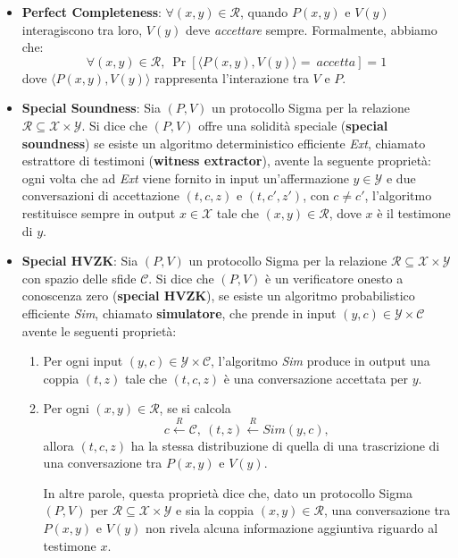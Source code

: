 \begin{itemize}
	\item \textbf{Perfect Completeness}: $\forall (x, y) \in \mathcal{R}$, quando $P(x, y)$ e $V(y)$ interagiscono tra loro, $V(y)$ deve \textit{accettare} sempre. Formalmente, abbiamo che:
	      $$\forall (x, y) \in \mathcal{R},\ \Pr \left[\langle P(x, y), V(y) \rangle =\ accetta \right] = 1$$
	      dove $\langle P(x, y), V(y) \rangle$ rappresenta l'interazione tra $V$ e $P$.
	\item \textbf{Special Soundness}: Sia $(P, V)$ un protocollo Sigma per la relazione $\mathcal{R} \subseteq \mathcal{X} \times \mathcal{Y}$. Si dice che $(P, V)$ offre una solidità speciale (\textbf{special soundness}) se esiste un algoritmo deterministico efficiente \textit{Ext}, chiamato estrattore di testimoni (\textbf{witness extractor}), avente la seguente proprietà: ogni volta che ad \textit{Ext} viene fornito in input un'affermazione $y \in \mathcal{Y}$ e due conversazioni di accettazione $(t, c, z)$ e $(t, c', z')$, con $c \neq c'$, l'algoritmo restituisce sempre in output $x \in \mathcal{X}$ tale che $(x, y) \in \mathcal{R}$, dove $x$ è il testimone di $y$.
	\item \textbf{Special HVZK}: Sia $(P, V)$ un protocollo Sigma per la relazione $\mathcal{R} \subseteq \mathcal{X} \times \mathcal{Y}$ con spazio delle sfide $\mathcal{C}$. Si dice che $(P, V)$ è un verificatore onesto a conoscenza zero (\textbf{special HVZK}), se esiste un algoritmo probabilistico efficiente \textit{Sim}, chiamato \textbf{simulatore}, che prende in input $(y, c) \in \mathcal{Y} \times \mathcal{C}$ avente le seguenti proprietà:
	      \begin{enumerate}
	      	\item Per ogni input $(y, c) \in \mathcal{Y} \times \mathcal{C}$, l'algoritmo \textit{Sim} produce in output una coppia $(t, z)$ tale che $(t, c, z)$ è una conversazione accettata per $y$.
	      	\item Per ogni $(x, y) \in \mathcal{R}$, se si calcola
	      	      $$c \overset{R}{\leftarrow} \mathcal{C},\ (t, z) \overset{R}{\leftarrow} Sim(y, c),$$
	      	      allora $(t, c, z)$ ha la stessa distribuzione di quella di una trascrizione di una conversazione tra $P(x, y)$ e $V(y)$.
	      	      
	      	      In altre parole, questa proprietà dice che, dato un protocollo Sigma $(P, V)$ per $\mathcal{R} \subseteq \mathcal{X} \times \mathcal{Y}$ e sia la coppia $(x, y) \in \mathcal{R}$, una conversazione tra $P(x, y)$ e $V(y)$ non rivela alcuna informazione aggiuntiva riguardo al testimone $x$.
	      \end{enumerate}
\end{itemize}

